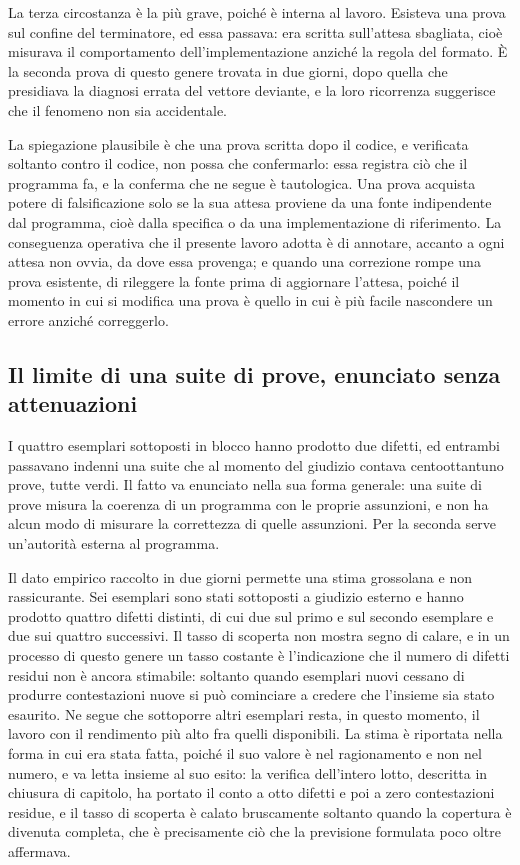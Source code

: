 La terza circostanza è la più grave, poiché è interna al lavoro. Esisteva una prova sul confine del terminatore, ed essa passava: era scritta sull'attesa sbagliata, cioè misurava il comportamento dell'implementazione anziché la regola del formato. È la seconda prova di questo genere trovata in due giorni, dopo quella che presidiava la diagnosi errata del vettore deviante, e la loro ricorrenza suggerisce che il fenomeno non sia accidentale.

La spiegazione plausibile è che una prova scritta dopo il codice, e verificata soltanto contro il codice, non possa che confermarlo: essa registra ciò che il programma fa, e la conferma che ne segue è tautologica. Una prova acquista potere di falsificazione solo se la sua attesa proviene da una fonte indipendente dal programma, cioè dalla specifica o da una implementazione di riferimento. La conseguenza operativa che il presente lavoro adotta è di annotare, accanto a ogni attesa non ovvia, da dove essa provenga; e quando una correzione rompe una prova esistente, di rileggere la fonte prima di aggiornare l'attesa, poiché il momento in cui si modifica una prova è quello in cui è più facile nascondere un errore anziché correggerlo.

\subsection*{Il limite di una suite di prove, enunciato senza attenuazioni}

I quattro esemplari sottoposti in blocco hanno prodotto due difetti, ed entrambi passavano indenni una suite che al momento del giudizio contava centoottantuno prove, tutte verdi. Il fatto va enunciato nella sua forma generale: una suite di prove misura la coerenza di un programma con le proprie assunzioni, e non ha alcun modo di misurare la correttezza di quelle assunzioni. Per la seconda serve un'autorità esterna al programma.

Il dato empirico raccolto in due giorni permette una stima grossolana e non rassicurante. Sei esemplari sono stati sottoposti a giudizio esterno e hanno prodotto quattro difetti distinti, di cui due sul primo e sul secondo esemplare e due sui quattro successivi. Il tasso di scoperta non mostra segno di calare, e in un processo di questo genere un tasso costante è l'indicazione che il numero di difetti residui non è ancora stimabile: soltanto quando esemplari nuovi cessano di produrre contestazioni nuove si può cominciare a credere che l'insieme sia stato esaurito. Ne segue che sottoporre altri esemplari resta, in questo momento, il lavoro con il rendimento più alto fra quelli disponibili. La stima è riportata nella forma in cui era stata fatta, poiché il suo valore è nel ragionamento e non nel numero, e va letta insieme al suo esito: la verifica dell'intero lotto, descritta in chiusura di capitolo, ha portato il conto a otto difetti e poi a zero contestazioni residue, e il tasso di scoperta è calato bruscamente soltanto quando la copertura è divenuta completa, che è precisamente ciò che la previsione formulata poco oltre affermava.
